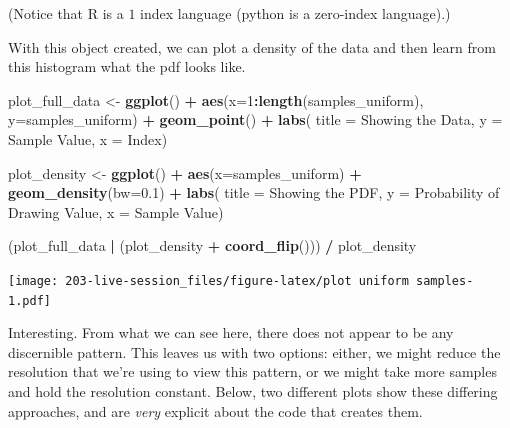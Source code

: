 \documentclass[
]{book}
\newenvironment{Shaded}{\begin{snugshade}}{\end{snugshade}}
\newcommand{\AttributeTok}[1]{\textcolor[rgb]{0.13,0.29,0.53}{#1}}
\newcommand{\DecValTok}[1]{\textcolor[rgb]{0.00,0.00,0.81}{#1}}
\newcommand{\FloatTok}[1]{\textcolor[rgb]{0.00,0.00,0.81}{#1}}
\newcommand{\FunctionTok}[1]{\textcolor[rgb]{0.13,0.29,0.53}{\textbf{#1}}}
\newcommand{\NormalTok}[1]{#1}
\newcommand{\OtherTok}[1]{\textcolor[rgb]{0.56,0.35,0.01}{#1}}
\newcommand{\SpecialCharTok}[1]{\textcolor[rgb]{0.81,0.36,0.00}{\textbf{#1}}}
\newcommand{\StringTok}[1]{\textcolor[rgb]{0.31,0.60,0.02}{#1}}
\theoremstyle{definition}
\theoremstyle{definition}
\theoremstyle{definition}
\theoremstyle{definition}
\theoremstyle{remark}
\begin{document}
(Notice that R is a \(1\) index language (python is a zero-index language).)

With this object created, we can plot a density of the data and then learn from this histogram what the pdf looks like.

\begin{Shaded}
\begin{Highlighting}[]
\NormalTok{plot\_full\_data }\OtherTok{\textless{}{-}} \FunctionTok{ggplot}\NormalTok{() }\SpecialCharTok{+} 
  \FunctionTok{aes}\NormalTok{(}\AttributeTok{x=}\DecValTok{1}\SpecialCharTok{:}\FunctionTok{length}\NormalTok{(samples\_uniform), }\AttributeTok{y=}\NormalTok{samples\_uniform) }\SpecialCharTok{+} 
  \FunctionTok{geom\_point}\NormalTok{()  }\SpecialCharTok{+} 
  \FunctionTok{labs}\NormalTok{(}
    \AttributeTok{title =} \StringTok{\textquotesingle{}Showing the Data\textquotesingle{}}\NormalTok{, }
    \AttributeTok{y     =} \StringTok{\textquotesingle{}Sample Value\textquotesingle{}}\NormalTok{, }
    \AttributeTok{x     =} \StringTok{\textquotesingle{}Index\textquotesingle{}}\NormalTok{)}

\NormalTok{plot\_density }\OtherTok{\textless{}{-}} \FunctionTok{ggplot}\NormalTok{() }\SpecialCharTok{+} 
  \FunctionTok{aes}\NormalTok{(}\AttributeTok{x=}\NormalTok{samples\_uniform) }\SpecialCharTok{+} 
  \FunctionTok{geom\_density}\NormalTok{(}\AttributeTok{bw=}\FloatTok{0.1}\NormalTok{)   }\SpecialCharTok{+} 
  \FunctionTok{labs}\NormalTok{(}
    \AttributeTok{title =} \StringTok{\textquotesingle{}Showing the PDF\textquotesingle{}}\NormalTok{, }
    \AttributeTok{y     =} \StringTok{\textquotesingle{}Probability of Drawing Value\textquotesingle{}}\NormalTok{, }
    \AttributeTok{x     =} \StringTok{\textquotesingle{}Sample Value\textquotesingle{}}\NormalTok{)}

\NormalTok{(plot\_full\_data }\SpecialCharTok{|}\NormalTok{ (plot\_density }\SpecialCharTok{+} \FunctionTok{coord\_flip}\NormalTok{())) }\SpecialCharTok{/} 
\NormalTok{  plot\_density }
\end{Highlighting}
\end{Shaded}

\texttt{[image: 203-live-session\_files/figure-latex/plot uniform samples-1.pdf]}

Interesting. From what we can see here, there does not appear to be any discernible pattern. This leaves us with two options: either, we might reduce the resolution that we're using to view this pattern, or we might take more samples and hold the resolution constant. Below, two different plots show these differing approaches, and are \emph{very} explicit about the code that creates them.
\end{document}
